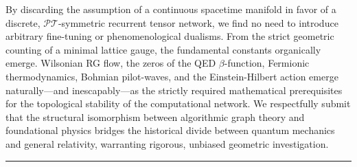 \documentclass[11pt, letterpaper]{article}
\newcommand{\PT}{\mathcal{PT}}
\theoremstyle{definition}
\theoremstyle{remark}
\begin{document}
By discarding the assumption of a continuous spacetime manifold in favor of a discrete, $\PT$-symmetric recurrent tensor network, we find no need to introduce arbitrary fine-tuning or phenomenological dualisms. From the strict geometric counting of a minimal lattice gauge, the fundamental constants organically emerge. Wilsonian RG flow, the zeros of the QED $\beta$-function, Fermionic thermodynamics, Bohmian pilot-waves, and the Einstein-Hilbert action emerge naturally---and inescapably---as the strictly required mathematical prerequisites for the topological stability of the computational network. We respectfully submit that the structural isomorphism between algorithmic graph theory and foundational physics bridges the historical divide between quantum mechanics and general relativity, warranting rigorous, unbiased geometric investigation.

\vspace{2em}
\hrule
\vspace{1.5em}
\end{document}
